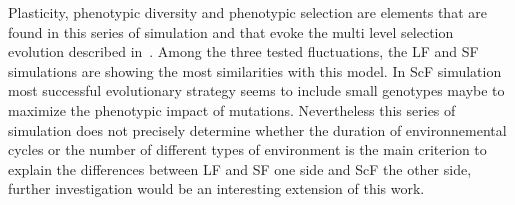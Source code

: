 Plasticity, phenotypic diversity and phenotypic selection are elements that are found in this series of simulation and that evoke the  multi level selection evolution described in~\citep{jablonka2014evolution}. Among the three tested fluctuations, the LF and SF simulations are showing the most similarities with this model. In ScF simulation most successful evolutionary strategy seems to include small genotypes maybe to maximize the phenotypic impact of mutations. Nevertheless this series of simulation does not precisely determine whether the duration of environnemental cycles or the number of different types of environment is the main criterion to explain the differences between LF and SF one side and ScF the other side, further investigation would be an interesting extension of this work.